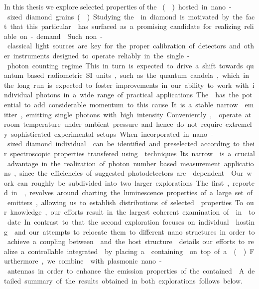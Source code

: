 
\label{ch::conclusion}

   In this thesis we explore selected properties of the \si \cc (\siv) hosted in nano-sized diamond grains (\nds). Studying the \sivc in diamond is motivated by the fact that this particular \cc has surfaced as a promising candidate for realizing reliable on-demand \spss. Such non-classical light sources are key for the proper calibration of detectors and other instruments designed to operate reliably in the single-photon counting regime. This in turn is expected to drive a shift towards quantum based radiometric SI units, such as the quantum candela, which in the long run is expected to foster improvements in our ability to work with individual photons in a wide range of practical applications.

   The \siv has the potential to add considerable momentum to this cause. It is a stable narrow \lw emitter, emitting single photons with high intensity. Conveniently, \sivs operate at room temperature under ambient pressure and hence do not require extremely sophisticated experimental setups. When incorporated in nano-sized diamond individual \sivs can be identified and preselected according to their spectroscopic properties transfered using \pp techniques. Its narrow \lw is a crucial advantage in the realization of photon number based measurement applications, since the efficiencies of suggested photodetectors are \wl dependent \cite{vaigu2017experimental}.

   Our work can roughly be subdivided into two larger explorations. The first, reported in , revolves around charting the luminescence properties of a large set of emitters, allowing us to establish distributions of selected \siv properties. To our knowledge, our efforts result in the largest coherent examination of \sivs in \nds to date. In contrast to that the second exploration focuses on individual \nds hosting \sivs and our attempts to relocate them to different nano structures in order to achieve a coupling between \sivs and the host structure.  details our efforts to realize a controllable integrated \sps by placing a \nd containing \sivs on top of a \vcsel (\VCSEL). Furthermore, we combine \nds with plasmonic nano-antennas in order to enhance the emission properties of the contained \sivs. A detailed summary of the results obtained in both explorations follows below.

